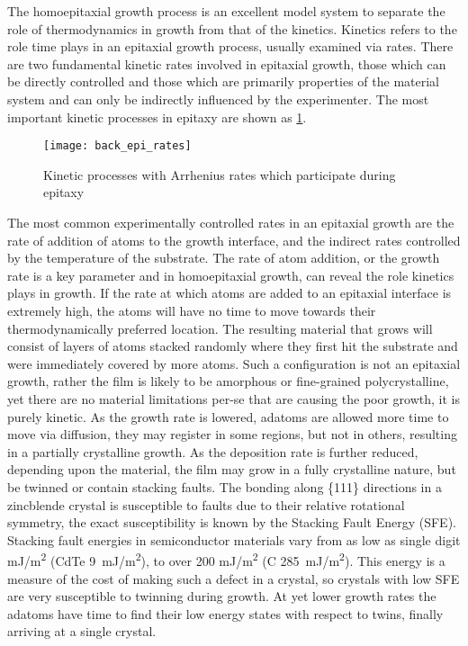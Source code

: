 The homoepitaxial growth process is an excellent model system to separate the role of thermodynamics in growth from that of the kinetics.
Kinetics refers to the role time plays in an epitaxial growth process, usually examined via rates.
There are two fundamental kinetic rates involved in epitaxial growth, those which can be directly controlled and those which are primarily properties of the material system and can only be indirectly influenced by the experimenter. The most important kinetic processes in epitaxy are shown as \cref{fig:back_epi_rates}.
\begin{figure}
 \centering \texttt{[image: back\_epi\_rates]}
 \caption[Kinetic Processes of atoms on surfaces]{\label{fig:back_epi_rates}Kinetic processes with Arrhenius rates which participate during epitaxy}
\end{figure}

The most common experimentally controlled rates in an epitaxial growth are the rate of addition of atoms to the growth interface, and the indirect rates controlled by the temperature of the substrate.
The rate of atom addition, or the growth rate is a key parameter and in homoepitaxial growth, can reveal the role kinetics plays in growth.
If the rate at which atoms are added to an epitaxial interface is extremely high, the atoms will have no time to move towards their thermodynamically preferred location.
The resulting material that grows will consist of layers of atoms stacked randomly where they first hit the substrate and were immediately covered by more atoms.
Such a configuration is not an epitaxial growth, rather the film is likely to be amorphous or fine-grained polycrystalline, yet there are no material limitations per-se that are causing the poor growth, it is purely kinetic.
As the growth rate is lowered, adatoms are allowed more time to move via diffusion, they may register in some regions, but not in others, resulting in a partially crystalline growth.
As the deposition rate is further reduced, depending upon the material, the film may grow in a fully crystalline nature, but be twinned or contain stacking faults.
The bonding along \{111\} directions in a zincblende crystal is susceptible to faults due to their relative rotational symmetry, the exact susceptibility is known by the Stacking Fault Energy (SFE)\cite{Duffar2010}.
Stacking fault energies in semiconductor materials vary from as low as single digit mJ/m\textsuperscript{2} (CdTe 9~mJ/m\textsuperscript{2}), to over 200 mJ/m\textsuperscript{2} (C 285~mJ/m\textsuperscript{2})\cite{Takeuchi1999}.
This energy is a measure of the cost of making such a defect in a crystal, so crystals with low SFE are very susceptible to twinning during growth.
At yet lower growth rates the adatoms have time to find their low energy states with respect to twins, finally arriving at a single crystal.

